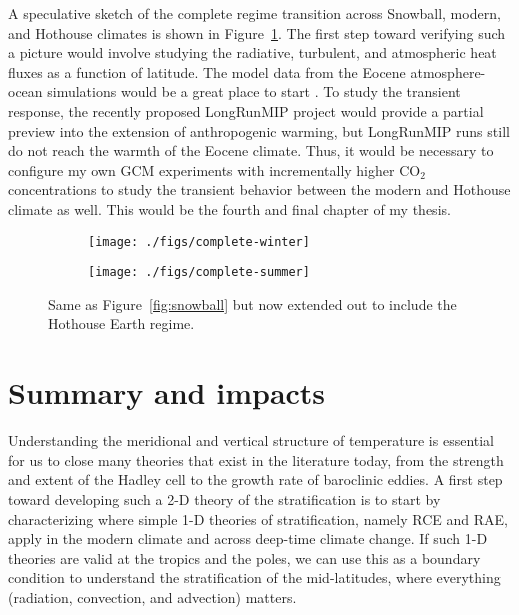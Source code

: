 \documentclass{article}
\begin{document}
A speculative sketch of the complete regime transition across Snowball, modern, and Hothouse climates is shown in Figure~\ref{fig:complete}. The first step toward verifying such a picture would involve studying the radiative, turbulent, and atmospheric heat fluxes as a function of latitude. The model data from the Eocene atmosphere-ocean simulations would be a great place to start \citep{lunt-et-al-2012}. To study the transient response, the recently proposed LongRunMIP project \citep{rugenstein-et-al-2019} would provide a partial preview into the extension of anthropogenic warming, but LongRunMIP runs still do not reach the warmth of the Eocene climate. Thus, it would be necessary to configure my own GCM experiments with incrementally higher CO$_2$ concentrations to study the transient behavior between the modern and Hothouse climate as well. This would be the fourth and final chapter of my thesis.

\begin{figure}
\centering
\begin{subfigure}{0.5\textwidth}
\texttt{[image: ./figs/complete-winter]}
\end{subfigure}%
\begin{subfigure}{0.5\textwidth}
\texttt{[image: ./figs/complete-summer]}
\end{subfigure}
\caption{Same as Figure~\ref{fig:snowball} but now extended out to include the Hothouse Earth regime.}
\label{fig:complete}
\end{figure}

\section{Summary and impacts}

Understanding the meridional and vertical structure of temperature is essential for us to close many theories that exist in the literature today, from the strength and extent of the Hadley cell to the growth rate of baroclinic eddies. A first step toward developing such a 2-D theory of the stratification is to start by characterizing where simple 1-D theories of stratification, namely RCE and RAE, apply in the modern climate and across deep-time climate change. If such 1-D theories are valid at the tropics and the poles, we can use this as a boundary condition to understand the stratification of the mid-latitudes, where everything (radiation, convection, and advection) matters.
\end{document}

